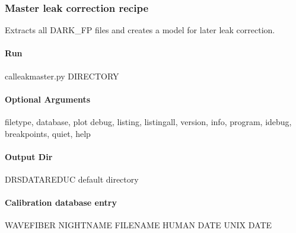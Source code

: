 \documentclass[a4paper,10pt,english]{report}
\begin{document}
\subsubsection{Master leak correction recipe}
\label{\detokenize{user/spirou/recipes/leak_master:master-leak-correction-recipe}}\label{\detokenize{user/spirou/recipes/leak_master:recipes-spirou-leak-master}}\label{\detokenize{user/spirou/recipes/leak_master::doc}}
Extracts all DARK\_FP files and creates a model for later leak correction.


\paragraph{Run}
\label{\detokenize{user/spirou/recipes/leak_master:run}}
\begin{sphinxVerbatim}[commandchars=\\\{\}]
cal\PYGZus{}leak\PYGZus{}master.py \PYG{o}{[}DIRECTORY\PYG{o}{]}
\end{sphinxVerbatim}


\paragraph{Optional Arguments}
\label{\detokenize{user/spirou/recipes/leak_master:optional-arguments}}
\begin{sphinxVerbatim}[commandchars=\\\{\}]
\PYGZhy{}\PYGZhy{}filetype, \PYGZhy{}\PYGZhy{}database, \PYGZhy{}\PYGZhy{}plot
\PYGZhy{}\PYGZhy{}debug, \PYGZhy{}\PYGZhy{}listing, \PYGZhy{}\PYGZhy{}listingall, \PYGZhy{}\PYGZhy{}version, \PYGZhy{}\PYGZhy{}info,
\PYGZhy{}\PYGZhy{}program, \PYGZhy{}\PYGZhy{}idebug, \PYGZhy{}\PYGZhy{}breakpoints, \PYGZhy{}\PYGZhy{}quiet, \PYGZhy{}\PYGZhy{}help
\end{sphinxVerbatim}


\paragraph{Output Dir}
\label{\detokenize{user/spirou/recipes/leak_master:output-dir}}
\begin{sphinxVerbatim}[commandchars=\\\{\}]
DRS\PYGZus{}DATA\PYGZus{}REDUC    default  directory
\end{sphinxVerbatim}


\paragraph{Calibration database entry}
\label{\detokenize{user/spirou/recipes/leak_master:calibration-database-entry}}
\begin{sphinxVerbatim}[commandchars=\\\{\}]
WAVE\PYGZus{}FIBER NIGHT\PYGZus{}NAME FILENAME HUMAN DATE UNIX DATE
\end{sphinxVerbatim}
\end{document}
